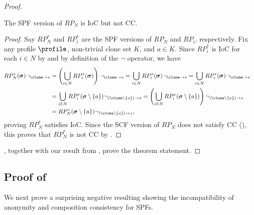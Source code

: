 \begin{proof}
\begin{lemma}\label{lemma:spfrpn}
    The SPF version of $RP_N$ is IoC but not CC.
\end{lemma}
\begin{proof}
    Say $RP^*_N$ and $RP^*_i$ are the SPF versions of $RP_N$ and $RP_i$, respectively. Fix any profile $\profile$, non-trivial clone set $K$, and $a \in K$. Since $RP^*_i$ is IoC for each $i \in N$ by  and by definition of the $\neg$ operator, we have
    \begin{align*}
        RP^*_N(\boldsymbol{\sigma}) \neg_{\clone \to z}&=
       \left(\bigcup_{i \in N}  RP^*_i(\boldsymbol{\sigma}) \right) \neg_{\clone \to z}
       = \bigcup_{i \in N}  RP^*_i(\boldsymbol{\sigma}) \neg_{\clone \to z} = \bigcup_{i \in N}  RP^*_i(\boldsymbol{\sigma}) \neg_{\clone \to z}\\&=\bigcup_{i \in N}  RP^*_i(\boldsymbol{\sigma} \setminus \{a\})\neg_{(\clone \setminus \{a\})\to z}=\left(\bigcup_{i \in N}  RP^*_i(\boldsymbol{\sigma} \setminus \{a\})\right)\neg_{(\clone \setminus \{a\})\to z}\\&=RP^*_N(\boldsymbol{\sigma} \setminus \{a\}) \neg_{(\clone \setminus \{a\})\to z},
    \end{align*}
    proving $RP^*_N$ satisfies IoC. Since the SCF version of $RP_N$ does not satisfy CC (), this proves that  $RP^*_N$ is not CC by .
\end{proof}
, together with our result from , prove the theorem statement.
\end{proof}

    

\subsection{Proof of }
We next prove a surprising negative resulting showing the incompatibility of anonymity and composition consistency for SPFs.

\anonspf*

